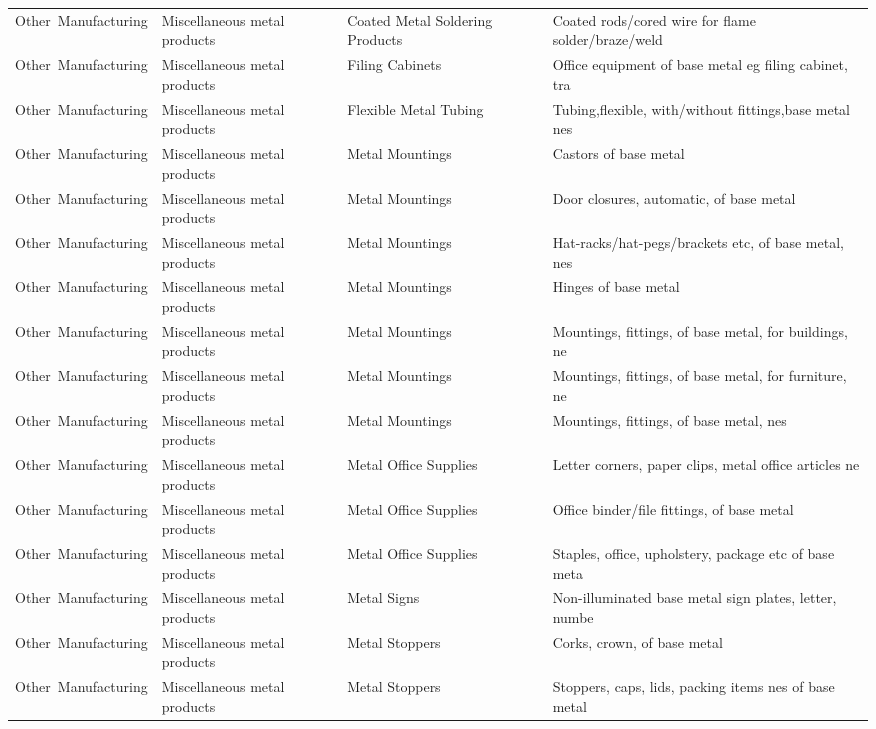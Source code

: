 \begin{appendices}
\begin{xltabular}{\textwidth}{|p{0.11\textwidth}|p{0.29\textwidth}|p{0.20\textwidth}|p{0.30\textwidth}|}
			Other\ Manufacturing & Miscellaneous metal products & Coated Metal Soldering Products & Coated rods/cored wire for flame solder/braze/weld \\
			Other\ Manufacturing & Miscellaneous metal products & Filing Cabinets & Office equipment of base metal eg filing cabinet, tra \\
			Other\ Manufacturing & Miscellaneous metal products & Flexible Metal Tubing & Tubing,flexible, with/without fittings,base metal nes \\
			Other\ Manufacturing & Miscellaneous metal products & Metal Mountings & Castors of base metal \\
			Other\ Manufacturing & Miscellaneous metal products & Metal Mountings & Door closures, automatic, of base metal \\
			Other\ Manufacturing & Miscellaneous metal products & Metal Mountings & Hat-racks/hat-pegs/brackets etc, of base metal, nes \\
			Other\ Manufacturing & Miscellaneous metal products & Metal Mountings & Hinges of base metal \\
			Other\ Manufacturing & Miscellaneous metal products & Metal Mountings & Mountings, fittings, of base metal, for buildings, ne \\
			Other\ Manufacturing & Miscellaneous metal products & Metal Mountings & Mountings, fittings, of base metal, for furniture, ne \\
			Other\ Manufacturing & Miscellaneous metal products & Metal Mountings & Mountings, fittings, of base metal, nes \\
			Other\ Manufacturing & Miscellaneous metal products & Metal Office Supplies & Letter corners, paper clips, metal office articles ne \\
			Other\ Manufacturing & Miscellaneous metal products & Metal Office Supplies & Office binder/file fittings, of base metal \\
			Other\ Manufacturing & Miscellaneous metal products & Metal Office Supplies & Staples, office, upholstery, package etc of base meta \\
			Other\ Manufacturing & Miscellaneous metal products & Metal Signs & Non-illuminated base metal sign plates, letter, numbe \\
			Other\ Manufacturing & Miscellaneous metal products & Metal Stoppers & Corks, crown, of base metal \\
			Other\ Manufacturing & Miscellaneous metal products & Metal Stoppers & Stoppers, caps, lids, packing items nes of base metal \\

\end{xltabular}
\end{appendices}
